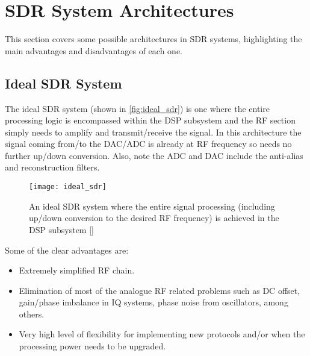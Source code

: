 \section{SDR System Architectures}
\label{sect:sdr_system_architecture}

This section covers some possible architectures in SDR systems, highlighting the main advantages and disadvantages of each one.

\subsection{Ideal SDR System}

The ideal SDR system (shown in \autoref{fig:ideal_sdr}) is one where the entire processing logic is encompassed within the DSP subsystem and the RF section simply needs to amplify and transmit/receive the signal. In this architecture the signal coming from/to the DAC/ADC is already at RF frequency so needs no further up/down conversion. Also, note the ADC and DAC include the anti-alias and reconstruction filters.

\begin{figure}[H]
  \centering
  \texttt{[image: ideal\_sdr]}
  \caption[An ideal SDR system]{An ideal SDR system where the entire signal processing (including up/down conversion to the desired RF frequency) is achieved in the DSP subsystem [\citeauthor{rf_bb_techniques_sdr}]}
  \label{fig:ideal_sdr}
\end{figure}

Some of the clear advantages are:
\begin{itemize}
  \item Extremely simplified RF chain.
  \item Elimination of most of the analogue RF related problems such as DC offset, gain/phase imbalance in IQ systems, phase noise from oscillators, among others.
  \item Very high level of flexibility for implementing new protocols and/or when the processing power needs to be upgraded.
\end{itemize}

